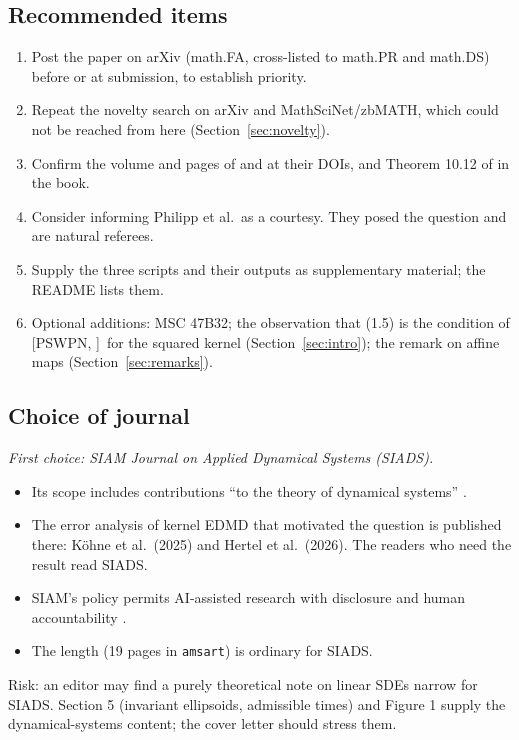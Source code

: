 \documentclass[11pt]{amsart}
\newcommand{\PS}[1][]{[PSWPN\ifx\relax#1\relax\else, #1\fi]}
\begin{document}
\subsection{Recommended items}
\begin{enumerate}
\item Post the paper on arXiv (math.FA, cross-listed to math.PR and math.DS) before or at submission, to establish
priority.
\item Repeat the novelty search on arXiv and MathSciNet/zbMATH, which could not be reached from here
(Section~\ref{sec:novelty}).
\item Confirm the volume and pages of \cite{Hertel} and \cite{Koehne} at their DOIs, and Theorem 10.12 of
\cite{Wendland} in the book.
\item Consider informing Philipp et al.\ as a courtesy. They posed the question and are natural referees.
\item Supply the three scripts and their outputs as supplementary material; the README lists them.
\item Optional additions: MSC 47B32; the observation that (1.5) is the condition of \PS\ for the squared kernel
(Section~\ref{sec:intro}); the remark on affine maps (Section~\ref{sec:remarks}).
\end{enumerate}

\subsection{Choice of journal}
\emph{First choice: SIAM Journal on Applied Dynamical Systems (SIADS).}
\begin{itemize}
\item Its scope includes contributions ``to the theory of dynamical systems'' \cite{src-siads}.
\item The error analysis of kernel EDMD that motivated the question is published there: Köhne et al.\ (2025) and
Hertel et al.\ (2026). The readers who need the result read SIADS.
\item SIAM's policy permits AI-assisted research with disclosure and human accountability \cite{src-siam-ai}.
\item The length (19 pages in \texttt{amsart}) is ordinary for SIADS.
\end{itemize}
Risk: an editor may find a purely theoretical note on linear SDEs narrow for SIADS. Section 5 (invariant ellipsoids,
admissible times) and Figure 1 supply the dynamical-systems content; the cover letter should stress them.
\end{document}
